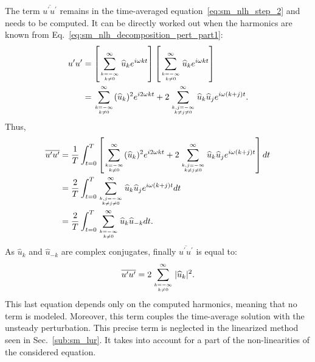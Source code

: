 The term $\overline{u^\prime u^\prime}$ remains in the time-averaged
equation~\eqref{eq:sm_nlh_step_2}
and needs to be computed. It can be 
directly worked out when the harmonics are known 
from Eq.~\eqref{eq:sm_nlh_decomposition_pert_part1}:
\begin{equation}
	\begin{split}
		u^\prime u^\prime &= 
		\left[
			\sum_{\genfrac{}{}{0pt}{}{k=-\infty}{k \neq 0}}^{\infty} \widehat{u}_k e^{i \omega k t} 
		\right]
		\left[
			\sum_{\genfrac{}{}{0pt}{}{k=-\infty}{k \neq 0}}^{\infty} \widehat{u}_k e^{i \omega k t} 
		\right] \\
		&= \sum_{\genfrac{}{}{0pt}{}{k=-\infty}{k \neq 0}}^{\infty} (\widehat{u}_k)^2
		   e^{i 2 \omega k t} +
		   2 \sum_{\genfrac{}{}{0pt}{}{k,j=-\infty}{k \neq j \neq 0}}^{\infty} 
		   \widehat{u}_k \widehat{u}_j e^{i \omega (k + j) t}.
	\end{split}
\end{equation}
Thus,
\begin{equation}
	\begin{split}
		\overline{u^\prime u^\prime} &= 
		\frac{1}{T} \int_{t=0}^{T} \left[ 
			\sum_{\genfrac{}{}{0pt}{}{k=-\infty}{k \neq 0}}^{\infty} (\widehat{u}_k)^2
		   	e^{i 2 \omega k t} +
		   	2 \sum_{\genfrac{}{}{0pt}{}{k,j=-\infty}{k \neq j \neq 0}}^{\infty} 
		   	\widehat{u}_k \widehat{u}_j e^{i \omega (k + j) t} 
		\right] dt\\
		&= \frac{2}{T} \int_{t=0}^{T} \sum_{\genfrac{}{}{0pt}{}{k,j=-\infty}{k \neq j \neq 0}}^{\infty} 
		   	\widehat{u}_k \widehat{u}_j 
		   	e^{i \omega (k + j) t} dt \\
		&= \frac{2}{T} \int_{t=0}^{T} 
			\sum_{\genfrac{}{}{0pt}{}{k=-\infty}{k \neq 0}}^{\infty} 
			\widehat{u}_k \widehat{u}_{-k}  dt.
	\end{split}
\end{equation}
As $\widehat{u}_k$ and $\widehat{u}_{-k}$ are complex conjugates,
finally $\overline{u^\prime u^\prime}$ is equal to:
\begin{equation}
	\overline{u^\prime u^\prime} = 
	2 \sum_{\genfrac{}{}{0pt}{}{k=-\infty}{k \neq 0}}^{\infty} |\widehat{u}_k|^2.
	\label{eq:sm_nlh_deterministic_stress_terms}
\end{equation}
This last equation depends only on the computed harmonics, meaning
that no term is modeled. Moreover, this term couples the
time-average solution with the unsteady perturbation. This precise
term is neglected in the linearized method seen in 
Sec.~\ref{sub:sm_lur}. It takes into account for a part of the 
non-linearities of the considered equation.

